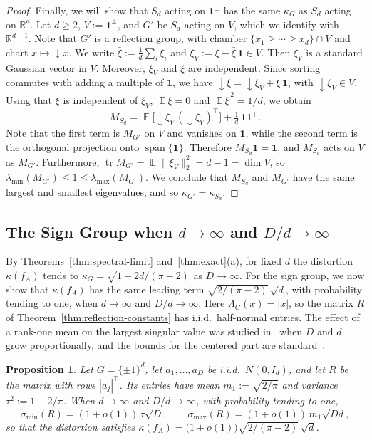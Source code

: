 \documentclass[11pt]{article}
\newcommand{\R}{\mathbb{R}}
\newtheorem{prop}[theor]{Proposition}
\theoremstyle{definition}
\DeclareMathOperator{\EX}{\mathbb{E}}
\begin{document}
\begin{proof}
	Finally, we will show that $S_d$ acting on $\mathbf 1^{\perp}$ has the same $\kappa_G$ as $S_d$
	acting on $\R^d$. Let $d\ge2$, $V:=\mathbf 1^{\perp}$, and $G'$ be $S_d$ acting on
	$V$, which we identify with $\R^{d-1}$. Note that $G'$ is a
	reflection group, with chamber $\{x_1\ge\cdots\ge x_d\}\cap V$ and chart
	$x\mapsto{\downarrow}x$. We write $\bar\xi:=\frac1d\sum_i\xi_i$ and
	$\xi_V:=\xi-\bar\xi\,\mathbf 1\in V$. Then $\xi_V$ is a standard Gaussian vector in $V$.
	Moreover, $\xi_V$ and $\bar\xi$ are independent.
	Since sorting commutes with adding a multiple of $\mathbf 1$, we have
	${\downarrow}\xi={\downarrow}\xi_V+\bar\xi\,\mathbf 1$, with ${\downarrow}\xi_V\in V$. Using that
	$\bar\xi$ is independent of $\xi_V$, $\EX\bar\xi=0$ and $\EX\bar\xi^{\,2}=1/d$, we obtain
	\[
	M_{S_d}=\EX\bigl[{\downarrow}\xi_V\,({\downarrow}\xi_V)^{\!\top}\bigr]+\tfrac1d\,\mathbf 1\mathbf 1^{\!\top}.
	\]
	Note that the first term is $M_{G'}$ on $V$ and vanishes on $\mathbf 1$, while the second
	term is the orthogonal projection onto $\operatorname{span}\{\mathbf 1\}$. Therefore $M_{S_d}\mathbf 1=\mathbf 1$, and $M_{S_d}$ acts on $V$ as $M_{G'}$. Furthermore,
	$\operatorname{tr}M_{G'}=\EX\|\xi_V\|_2^2=d-1=\dim V$, so
	$\lambda_{\min}(M_{G'})\le1\le\lambda_{\max}(M_{G'})$. We conclude that $M_{S_d}$ and $M_{G'}$
	have the same largest and smallest eigenvalues, and so $\kappa_{G'}=\kappa_{S_d}$.
\end{proof}
\subsection{The Sign Group when $d\to\infty$ and $D/d\to\infty$}
\label{app:sign-joint}

By Theorems~\ref{thm:spectral-limit} and~\ref{thm:exact}(a), for fixed $d$ the distortion
$\kappa(f_A)$ tends to $\kappa_G=\sqrt{1+2d/(\pi-2)}$ as $D\to\infty$. For the sign group, we now
show that $\kappa(f_A)$ has the same leading term $\sqrt{2/(\pi-2)}\,\sqrt d$, with probability
tending to one, when $d\to\infty$ and $D/d\to\infty$. Here $\Lambda_G(x)=|x|$, so the matrix $R$
of Theorem~\ref{thm:reflection-constants} has i.i.d.\ half-normal entries. The effect of a
rank-one mean on the largest singular value was studied in~\cite{silverstein1994spectral} when
$D$ and $d$ grow proportionally, and the bounds for the centered part are
standard~\cite{vershynin2018high}.

\begin{prop}
	\label{prop:sign-joint}
	Let $G=\{\pm1\}^d$, let $a_1,\dots,a_D$ be i.i.d.\ $N(0,I_d)$, and let $R$ be the
	matrix with rows $|a_j|^{\!\top}$. Its entries have mean $m_1:=\sqrt{2/\pi}$ and
	variance $\tau^2:=1-2/\pi$. When $d\to\infty$ and $D/d\to\infty$, with
	probability tending to one,
	\[
	\sigma_{\min}(R)=(1+o(1))\,\tau\sqrt{D},
	\qquad
	\sigma_{\max}(R)=(1+o(1))\,m_1\sqrt{Dd},
	\]
	so that the distortion satisfies
	$\kappa(f_A)=\bigl(1+o(1)\bigr)\sqrt{2/(\pi-2)}\,\sqrt d$.
\end{prop}
\end{document}
